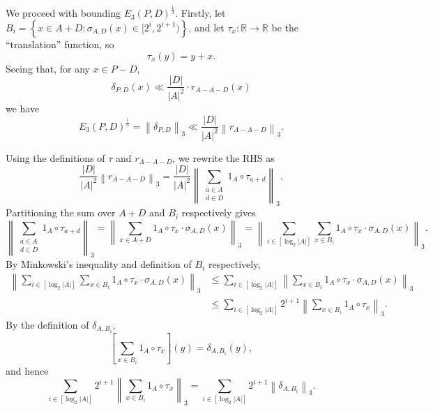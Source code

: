 \documentclass[reqno]{amsart}
\numberwithin{equation}{section}
\begin{document}
We proceed with bounding \(E_{3} (P,D)^{\frac{1}{3} }\). Firstly, let \(B_{i} = \left\{ x \in A + D : \sigma_{A,D} (x) \in [2^{i},2^{i+1}) \right\} \),
and let \(\tau_{x} :\mathbb{R}  \to \mathbb{R} \) be the ``translation'' function, so
\[
    \tau_{x} (y) = y + x
.\]
Seeing that, for any \(x \in P-D\),
\[
    \delta_{P,D} (x) \ll \frac{\left\lvert D \right\rvert }{\left\lvert A \right\rvert ^{2}} \cdot r_{A-A - D} (x) 
\]
we have
\[
   E_{3} (P,D)^{\frac{1}{3} } = \left\lVert \delta_{P,D}  \right\rVert _{3}  \ll \frac{\left\lvert D \right\rvert }{\left\lvert A \right\rvert ^{2}} \left\lVert r_{A-A-D} \right\rVert _{3}
.\]

Using the definitions of \(\tau\) and \(r_{A-A-D} \), we rewrite the RHS as
\[
    \frac{\left\lvert D \right\rvert }{\left\lvert A \right\rvert ^{2}}  \left\lVert r_{A-A-D}  \right\rVert _{3}  = \frac{\left\lvert D \right\rvert }{\left\lvert A \right\rvert ^{2}}  \left\lVert \sum _{\substack{ a \in A \\ d \in D }}  1_{A} \circ \tau_{a + d}   \right\rVert _{3} 
.\]
Partitioning the sum over \(A+D\) and \(B_{i} \) respectively gives
\[
    \left\lVert \sum _{\substack{ a \in A \\ d \in D }}  1_{A} \circ \tau_{a + d}   \right\rVert _{3} = \left\lVert \sum _{x \in A + D} 1_{A} \circ \tau_{x} \cdot \sigma_{A,D}  (x) \right\rVert _{3} = \left\lVert \sum _{i \in [\log _{2} \left\lvert A \right\rvert ] } \sum _{x \in B_{i} } 1_{A} \circ \tau_{x} \cdot \sigma_{A,D} (x) \right\rVert _{3}
.\]
By Minkowski's inequality and definition of \(B_{i} \) respectively,
\begin{align*}
    \left\lVert \sum _{i \in [\log _{2} \left\lvert A \right\rvert ] } \sum _{x \in B_{i} } 1_{A} \circ \tau_{x} \cdot \sigma_{A,D} (x) \right\rVert _{3}&  \leq \sum _{i \in [\log _{2} \left\lvert A \right\rvert ]} \left\lVert \sum _{x \in B_{i} } 1_{A} \circ \tau_{x} \cdot \sigma_{A,D} (x) \right\rVert _{3} \\
    & \leq \sum _{i \in [\log _{2} \left\lvert A \right\rvert ]} 2^{i+1} \left\lVert \sum _{x \in B_{i} } 1_{A} \circ \tau_{x}  \right\rVert _{3}.
\end{align*}
By the definition of \(\delta_{A,B_{i} } \),
\[
    \left[ \sum _{x \in B_{i} } 1_{A} \circ \tau_{x} \right] (y) = \delta_{A,B_{i} } (y)
,\]
and hence
\[
    \sum _{i \in [\log _{2} \left\lvert A \right\rvert ]} 2^{i+1} \left\lVert \sum _{x \in B_{i} } 1_{A} \circ \tau_{x}  \right\rVert _{3}  = \sum _{i \in [ \log _{2} \left\lvert A \right\rvert ]} 2^{i+1} \left\lVert \delta_{A,B_{i} }  \right\rVert _{3} 
.\]
\end{document}
